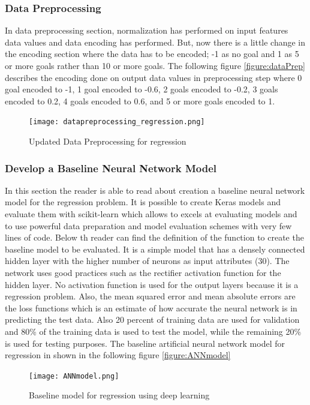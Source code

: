 \subsubsection{Data Preprocessing}
In data preprocessing section, normalization has performed on input features data values and data encoding has performed. But, now there is a little change in the encoding section where the data has to be encoded; -1 as no goal and 1 as 5 or more goals rather than 10 or more goals.\newline
The following figure \autoref{figure:dataPrep} describes the encoding done on output data values in preprocessing step where 0 goal encoded to -1, 1 goal encoded to -0.6, 2 goals encoded to -0.2, 3 goals encoded to 0.2, 4 goals encoded to 0.6, and 5 or more goals encoded to 1.\newline
\begin{figure}[H]
\begin{center}
\texttt{[image: datapreprocessing\_regression.png]}
\end{center}
\caption{Updated Data Preprocessing for regression }
\label{figure:dataPrep1}
\end{figure}
\subsubsection{Develop a Baseline Neural Network Model}
In this section the reader is able to read about creation a baseline neural network model for the regression problem. It is possible to create Keras models and evaluate them with scikit-learn which allows to excels at evaluating models and to use powerful data preparation and model evaluation schemes with very few lines of code.\newline
Below th reader can find the definition of the function to create the baseline model to be evaluated. It is a simple model that has a densely connected hidden layer with the higher number of neurons as input attributes (30). The network uses good practices such as the rectifier activation function for the hidden layer. No activation function is used for the output layers because it is a regression problem.\newline
Also, the mean squared error and mean absolute errors are the loss functions which is an estimate of how accurate the neural network is in predicting the test data. Also 20 percent of training data are used for validation and 80\% of the training data is used to test the model, while the remaining 20\% is used for testing purposes.\newline
The baseline artificial neural network model for regression in shown in the following figure \autoref{figure:ANNmodel} \newline
\begin{figure}[H]
\begin{center}
\texttt{[image: ANNmodel.png]}
\end{center}
\caption{Baseline model for regression using deep learning }
\label{figure:ANNmodel}
\end{figure}

